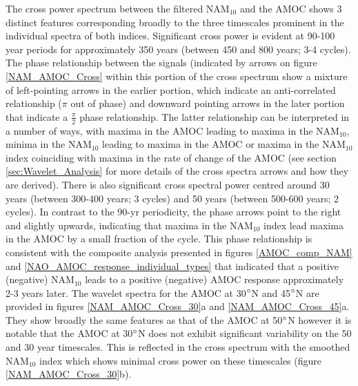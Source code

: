 The cross power spectrum between the filtered NAM$_{10}$ and the AMOC shows 3 distinct features corresponding broadly to the three timescales prominent in the individual spectra of both indices. Significant cross power is evident at 90-100 year periods for approximately 350 years (between 450 and 800 years; 3-4 cycles). The phase relationship between the signals (indicated by arrows on figure \ref{NAM_AMOC_Cross} within this portion of the cross spectrum  show a mixture of left-pointing arrows in the earlier portion, which indicate an anti-correlated relationship  ($\pi$ out of phase) and downward pointing arrows in the later portion that indicate a $\frac{\pi}{2}$ phase relationship. The latter relationship can be interpreted in a number of ways, with maxima in the AMOC leading to maxima in the NAM$_{10}$, minima in the NAM$_{10}$ leading to maxima in the AMOC or maxima in the NAM$_{10}$ index coinciding with maxima in the rate of change of the AMOC (see section \ref{sec:Wavelet_Analysis} for more details of the cross spectra arrows and how they are derived). There is also significant cross spectral power centred around 30 years (between 300-400 years; 3 cycles) and 50 years (between 500-600 years; 2 cycles). In contrast to the 90-yr periodicity, the phase arrows point to the right and slightly upwards, indicating that maxima in the NAM$_{10}$ index lead maxima in the AMOC by a small fraction of the cycle. This phase relationship is consistent with the composite analysis presented in figures \ref{AMOC_comp_NAM} and \ref{NAO_AMOC_response_individual_types} that indicated that a positive (negative) NAM$_{10}$ leads to a positive (negative) AMOC response approximately 2-3 years later. The wavelet spectra for the AMOC at 30$\degree$N and 45$\degree$N are provided in figures \ref{NAM_AMOC_Cross_30}a and \ref{NAM_AMOC_Cross_45}a. They show broadly the same features as that of the AMOC at 50$\degree$N however it is notable that the AMOC at 30$\degree$N does not exhibit significant variability on the 50 and 30 year timescales. This is reflected in the cross spectrum with the smoothed NAM$_{10}$ index which shows minimal cross power on these timescales (figure \ref{NAM_AMOC_Cross_30}b). 

